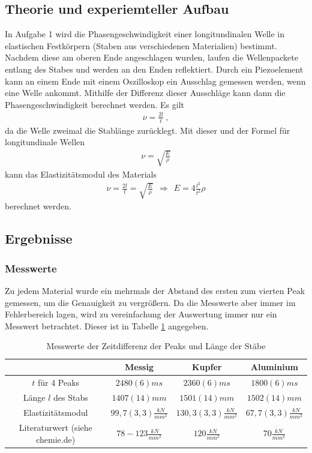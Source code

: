 \documentclass[11pt, a4paper]{article}
\begin{document}
    \subsection{Theorie und experiemteller Aufbau}
    In Aufgabe 1 wird die Phasengeschwindigkeit einer longitundinalen Welle in elastischen Festkörpern (Staben aus verschiedenen Materialien) bestimmt.
    Nachdem diese am oberen Ende angeschlagen wurden, laufen die Wellenpackete entlang des Stabes und werden an den Enden reflektiert.
    Durch ein Piezoelement kann an einem Ende mit einem Oszilloskop ein Ausschlag gemessen werden, wenn eine Welle ankommt.
    Mithilfe der Differenz dieser Ausschläge kann dann die Phasengeschwindigkeit berechnet werden. Es gilt
    \begin{align}
        \nu = \frac{2l}{t} \ ,
    \end{align}
    da die Welle zweimal die Stablänge zurücklegt. Mit dieser und der Formel für longitundinale Wellen
    \begin{align}
        \nu = \sqrt{\frac{E}{\rho}}
    \end{align}
    kann das Elastizitätsmodul des Materials
    \begin{align}
        \nu = \frac{2l}{t} = \sqrt{\frac{E}{\rho}} \ \ \Rightarrow \ \ E = 4\frac{l^2}{t^2} \rho
    \end{align}
    berechnet werden.

    \subsection{Ergebnisse}
    \subsubsection{Messwerte}
    Zu jedem Material wurde ein mehrmals der Abstand des ersten zum
    vierten Peak gemessen, um die Genauigkeit zu vergrößern. Da die Messwerte aber immer im Fehlerbereich lagen,
    wird zu vereinfachung der Auswertung immer nur ein Messwert betrachtet. Dieser ist in Tabelle \ref{ex:mess1}
    angegeben. 
    \begin{table}[]
        \centering
        \begin{tabular}{c | c | c | c}
           & Messig & Kupfer & Aluminium \\ \hline
            $ t $ für 4 Peaks & $ 2480(6)ms $ & $ 2360(6)ms $ & $ 1800(6)ms $ \\ \hline
            Länge $l$ des Stabs & $1407(14)mm$ & $1501(14)mm$ & $1502(14)mm$ \\ \hline
            Elastizitätsmodul & $99,7(3,3)\frac{kN}{mm^2}$ & $130,3(3,3)\frac{kN}{mm^2}$ & $67,7(3,3)\frac{kN}{mm^2}$ \\ \hline
            Literaturwert (siehe chemie.de) & $78-123\frac{kN}{mm^2}$ & $120\frac{kN}{mm^2}$ & $70\frac{kN}{mm^2}$
        \end{tabular}
        \caption{Messwerte der Zeitdifferenz der Peaks und Länge der  Stäbe}
        \label{ex:mess1}
    \end{table}
\end{document}
